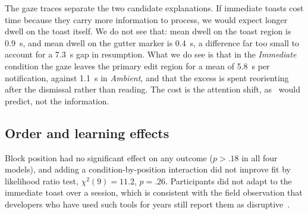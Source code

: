 The gaze traces separate the two candidate explanations. If immediate toasts
cost time because they carry more information to process, we would expect
longer dwell on the toast itself. We do not see that: mean dwell on the toast
region is 0.9~s, and mean dwell on the gutter marker is 0.4~s, a difference far
too small to account for a 7.3~s gap in resumption. What we do see is that in
the \emph{Immediate} condition the gaze leaves the primary edit region for a
mean of 5.8~s per notification, against 1.1~s in \emph{Ambient}, and that the
excess is spent reorienting after the dismissal rather than reading. The cost
is the attention shift, as~\citet{okonjo2016peripheral} would predict, not the
information.

\subsection{Order and learning effects}

Block position had no significant effect on any outcome
($p > .18$ in all four models), and adding a condition-by-position interaction
did not improve fit by likelihood ratio test, $\chi^2(9) = 11.2$, $p = .26$.
Participants did not adapt to the immediate toast over a session, which is
consistent with the field observation that developers who have used such tools
for years still report them as disruptive~\citep{steinbach2019telemetry}.
